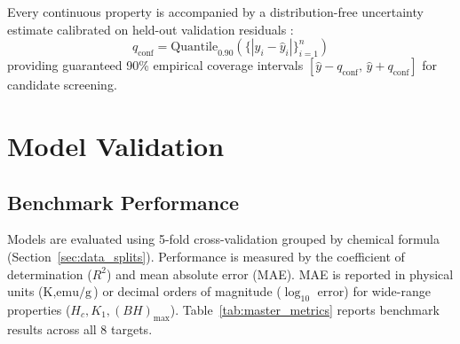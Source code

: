\documentclass[11pt,a4paper]{article}
\begin{document}
Every continuous property is accompanied by a distribution-free uncertainty estimate calibrated on held-out validation residuals \cite{vovk2005}:
\begin{equation}
    q_{\text{conf}} = \text{Quantile}_{0.90} \left( \{ |y_i - \hat{y}_i| \}_{i=1}^n \right)
\end{equation}
providing guaranteed 90\% empirical coverage intervals $[\hat{y} - q_{\text{conf}},\, \hat{y} + q_{\text{conf}}]$ for candidate screening.

\clearpage
\section{Model Validation}

\subsection{Benchmark Performance}
\label{sec:master_benchmark}

Models are evaluated using 5-fold cross-validation grouped by chemical formula (Section~\ref{sec:data_splits}). Performance is measured by the coefficient of determination ($R^2$) and mean absolute error (MAE). MAE is reported in physical units ($\text{K}, \text{emu/g}$) or decimal orders of magnitude ($\log_{10}$ error) for wide-range properties ($H_c, K_1, (BH)_{\max}$). Table~\ref{tab:master_metrics} reports benchmark results across all 8 targets.
\end{document}

